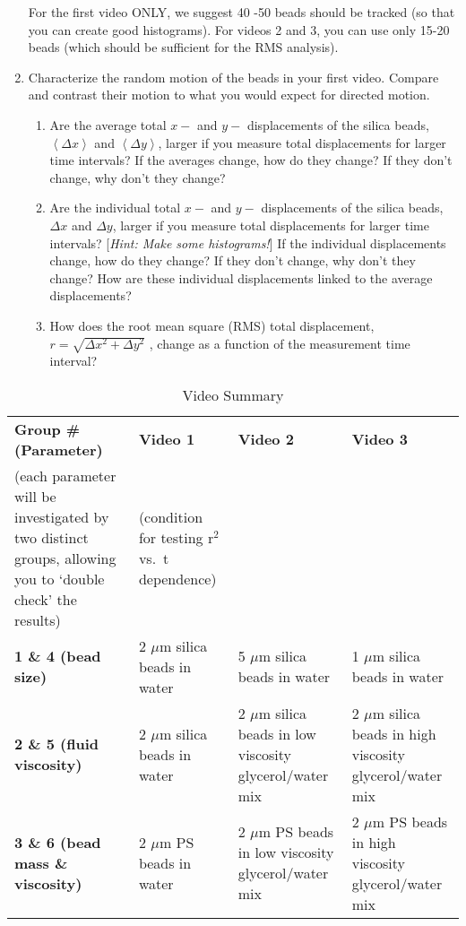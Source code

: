 \begin{enumerate}
For the first video ONLY, we suggest 40 -50 beads should be tracked (so that you can create good histograms). 
For videos 2 and 3, you can use only 15-20 beads (which should be sufficient for the RMS analysis).
\item Characterize the random motion of the beads in your first video. Compare and contrast their motion to what you would expect for directed motion.
\begin{enumerate}
\item Are the average total $x-$ and $y-$ displacements of the silica beads, $\left \langle \Delta x \right \rangle$ and $\left \langle \Delta y \right \rangle$, larger if you measure total displacements for larger time intervals? If the averages change, how do they change? If they don't change, why don't they change?
\item Are the individual total $x-$ and $y-$ displacements of the silica beads, $\Delta x$ and $\Delta y$, larger if you measure total displacements for larger time intervals? [\textit{Hint: Make some histograms!}] If the individual displacements change, how do they change? If they don't change, why don't they change? How are these individual displacements linked to the average displacements?
\item How does the root mean square (RMS) total displacement, $r=\sqrt{\Delta x^2+\Delta y^2}$ , change as a function of the measurement time interval?
\end{enumerate}
\end{enumerate}

\begin{table}[ht]
\centering
\caption{Video Summary}
\label{tab:exp3video}
\begin{tabular}{|p{4.5cm}|p{3cm}|p{3cm}|p{3cm}|}
\hline
 \textbf{Group \# (Parameter)} & \textbf{Video 1} & \textbf{Video 2} & \textbf{Video 3}  \\
 (each parameter will be investigated by two distinct groups, allowing you to `double check' the results) & (condition for testing r$^2$ vs.\ t dependence) &  & \\ \hline
 \textbf{1 \& 4 (bead size)} & 2 $\mu$m silica beads in water & 5 $\mu$m silica beads in water & 1 $\mu$m silica beads in water \\ \hline
 \textbf{2 \& 5 (fluid viscosity)} & 2 $\mu$m silica beads in water & 2 $\mu$m silica beads in low viscosity glycerol/water mix & 2 $\mu$m silica beads in high viscosity glycerol/water mix \\ \hline
 \textbf{3 \& 6 (bead mass \& viscosity)} & 2 $\mu$m PS beads in water & 2 $\mu$m PS beads in low viscosity glycerol/water mix & 2 $\mu$m PS beads in high viscosity glycerol/water mix \\ \hline
\end{tabular}
\end{table}

